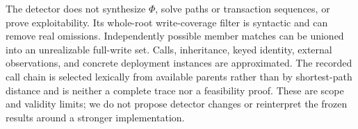 The detector does not synthesize \(\Phi\), solve paths or transaction sequences, or prove exploitability. Its whole-root write-coverage filter is syntactic and can remove real omissions. Independently possible member matches can be unioned into an unrealizable full-write set. Calls, inheritance, keyed identity, external observations, and concrete deployment instances are approximated. The recorded call chain is selected lexically from available parents rather than by shortest-path distance and is neither a complete trace nor a feasibility proof. These are scope and validity limits; we do not propose detector changes or reinterpret the frozen results around a stronger implementation.
